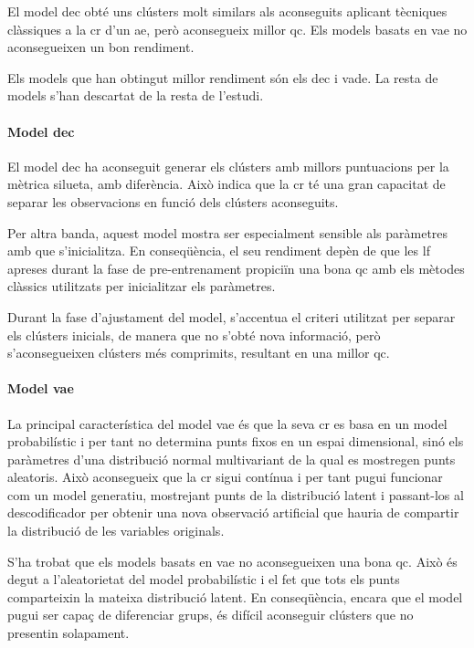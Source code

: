 \documentclass[CAT,BIB]{TFUOC}%
\begin{document}
    El model \gls{dec} obté uns clústers molt similars
    als aconseguits aplicant tècniques clàssiques a la \gls{cr} d'un \gls{ae},
    però aconsegueix millor \gls{qc}.
    Els models basats en \gls{vae} no aconsegueixen un bon rendiment.

    Els models que han obtingut millor rendiment
    són els \gls{dec} i \gls{vade}.
    La resta de models s'han descartat
    de la resta de l'estudi.


    \paragraph{Model \gls{dec}}
        El model \gls{dec} ha aconseguit generar
        els clústers amb millors puntuacions per la mètrica silueta,
        amb diferència.
        Això indica que la \gls{cr} té una gran capacitat
        de separar les observacions en funció dels clústers aconseguits.

        Per altra banda,
        aquest model mostra ser especialment sensible
        als paràmetres amb que s'inicialitza.
        En conseqüència,
        el seu rendiment depèn de que les \gls{lf} apreses durant la fase de pre-entrenament
        propiciïn una bona \gls{qc} amb els mètodes clàssics
        utilitzats per inicialitzar els paràmetres.

        Durant la fase d'ajustament del model,
        s'accentua el criteri utilitzat per separar els clústers inicials,
        de manera que no s'obté nova informació,
        però s'aconsegueixen clústers més comprimits,
        resultant en una millor \gls{qc}.


    \paragraph{Model \gls{vae}}
        La principal característica del model \gls{vae}
        és que la seva \gls{cr} es basa en un model probabilístic
        i per tant no determina punts fixos en un espai dimensional,
        sinó els paràmetres d'una distribució normal multivariant
        de la qual es mostregen punts aleatoris.
        Això aconsegueix que la \gls{cr} sigui contínua
        i per tant pugui funcionar com un model generatiu,
        mostrejant punts de la distribució latent
        i passant-los al descodificador
        per obtenir una nova observació artificial
        que hauria de compartir la distribució de les variables originals.

        S'ha trobat que els models basats en \gls{vae}
        no aconsegueixen una bona \gls{qc}.
        Això és degut a l'aleatorietat del model probabilístic
        i el fet que tots els punts comparteixin la mateixa distribució latent.
        En conseqüència,
        encara que el model pugui ser capaç de diferenciar grups,
        és difícil aconseguir clústers que no presentin solapament.
\end{document}
